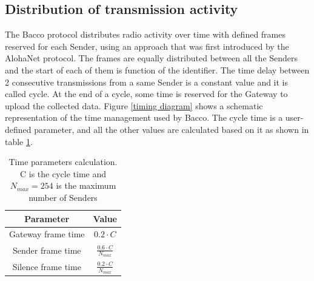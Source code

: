 \subsection{Distribution of transmission activity}
The Bacco protocol distributes radio activity over time with defined frames reserved for each Sender, using
an approach that was first introduced by the AlohaNet\cite{alohanet} protocol. The frames are equally distributed between
all the Senders and the start of each of them is function of the identifier. The time delay between 2 consecutive
transmissions from a same Sender is a constant value and it is called cycle. At the end of a cycle, some time is
reserved for the Gateway to upload the collected data. Figure \ref{timing diagram} shows a schematic representation of
the time management used by Bacco. The cycle time is a user-defined parameter, and all the other values are
calculated based on it as shown in table \ref{timing table}. \\

\begin{table}[h]
    \centering
    \setlength{\extrarowheight}{7pt}
    \begin{tabular}{ |c|c| }
        \hline
        \textbf{Parameter} & \textbf{Value}\\
        \hline
        Gateway frame time & $0.2 \cdot C$\\
        Sender frame time & $\frac{0.6 \cdot C}{N_{max}}$\\
        Silence frame time & $\frac{0.2 \cdot C}{N_{max}}$\\
        \hline
    \end{tabular}
    \caption{Time parameters calculation. C is the cycle time and $N_{max} = 254$ is the maximum number of Senders}
    \label{timing table}
\end{table}

